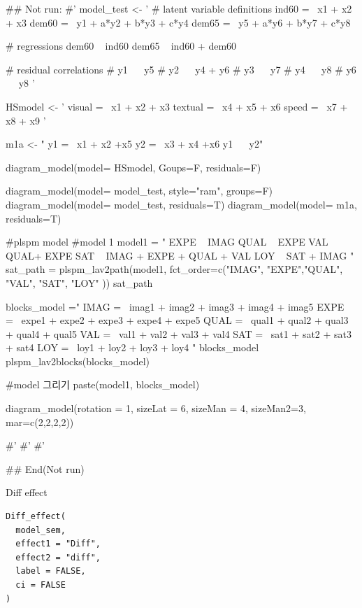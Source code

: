 \documentclass[a4paper]{book}
\begin{document}
\begin{Examples}
\begin{ExampleCode}
## Not run: 
#'
model_test <- '
  # latent variable definitions
     ind60 =~ x1 + x2 + x3
     dem60 =~ y1 + a*y2 + b*y3 + c*y4
     dem65 =~ y5 + a*y6 + b*y7 + c*y8

  # regressions
    dem60 ~ ind60
    dem65 ~ ind60 + dem60

  # residual correlations
    # y1 ~~ y5
    # y2 ~~ y4 + y6
    # y3 ~~ y7
    # y4 ~~ y8
    # y6 ~~ y8
'

HSmodel <- ' visual  =~ x1 + x2 + x3
             textual =~ x4 + x5 + x6
             speed   =~ x7 + x8 + x9 '


m1a <- "
y1 =~ x1 + x2 +x5
y2 =~ x3 + x4 +x6
y1 ~~ y2"

diagram_model(model= HSmodel, Goups=F,  residuals=F)

diagram_model(model= model_test, style="ram", groups=F)
diagram_model(model= model_test, residuals=T)
diagram_model(model= m1a, residuals=T)


#plspm model
#model 1
model1 = "
EXPE ~ IMAG
QUAL ~ EXPE
VAL ~  QUAL+ EXPE
SAT ~ IMAG + EXPE + QUAL + VAL
LOY ~ SAT + IMAG
"
sat_path = plspm_lav2path(model1,
                          fct_order=c("IMAG", "EXPE","QUAL", "VAL", "SAT", "LOY" ))
sat_path

blocks_model ="
IMAG =~ imag1 + imag2 + imag3 + imag4 + imag5
EXPE =~ expe1 + expe2 + expe3 + expe4 + expe5
QUAL =~ qual1 + qual2 + qual3 + qual4 + qual5
VAL =~ val1 + val2 + val3 + val4
SAT =~ sat1 + sat2 + sat3 + sat4
LOY =~ loy1 + loy2 + loy3 + loy4
"
blocks_model
plspm_lav2blocks(blocks_model)

#model 그리기
paste(model1, blocks_model)%

  diagram_model(rotation = 1, sizeLat = 6, sizeMan = 4, sizeMan2=3,
                mar=c(2,2,2,2))

#'
#'
#'

## End(Not run)
\end{ExampleCode}
\end{Examples}
%
\begin{Description}
Diff effect
\end{Description}
%
\begin{Usage}
\begin{verbatim}
Diff_effect(
  model_sem,
  effect1 = "Diff",
  effect2 = "diff",
  label = FALSE,
  ci = FALSE
)
\end{verbatim}
\end{Usage}
\end{document}
